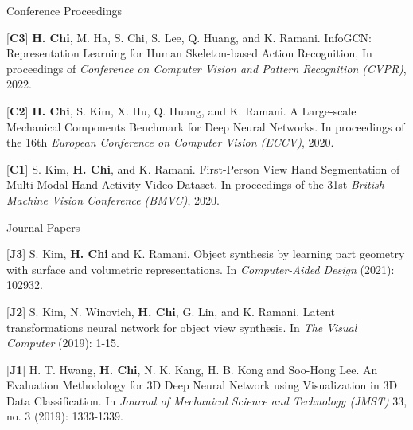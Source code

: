 


\begin{cventries}
\cvpub
{Conference Proceedings} %
{ %
\begin{cvitems}
\item {[\textbf{C3}] \textbf{H. Chi}, M. Ha, S. Chi, S. Lee, Q. Huang, and K. Ramani. InfoGCN: Representation Learning for Human Skeleton-based Action Recognition, In proceedings of \textit{Conference on Computer Vision and Pattern Recognition (CVPR)}, 2022.}
\item {[\textbf{C2}] \textbf{H. Chi}, S. Kim, X. Hu, Q. Huang, and K. Ramani. A Large-scale Mechanical Components Benchmark for Deep Neural Networks. In proceedings of the 16th \textit{European Conference on Computer Vision (ECCV)}, 2020.}
\item {[\textbf{C1}] S. Kim, \textbf{H. Chi}, and K. Ramani. First-Person View Hand Segmentation of Multi-Modal Hand Activity Video Dataset. In proceedings of the 31st \textit{British Machine Vision Conference (BMVC)}, 2020.}
\end{cvitems}
}


\cvpub
{Journal Papers} %
{ %
\begin{cvitems}
\item {[\textbf{J3}] S. Kim, \textbf{H. Chi} and K. Ramani. Object synthesis by learning part geometry with surface and volumetric representations. In \textit{Computer-Aided Design} (2021): 102932.}
\item {[\textbf{J2}] S. Kim, N. Winovich, \textbf{H. Chi}, G. Lin, and K. Ramani. Latent transformations neural network for object view synthesis. In \textit{The Visual Computer} (2019): 1-15.}
\item {[\textbf{J1}] H. T. Hwang, \textbf{H. Chi}, N. K. Kang, H. B. Kong and Soo-Hong Lee. An Evaluation Methodology for 3D Deep Neural Network using Visualization in 3D Data Classification. In \textit{Journal of Mechanical Science and Technology (JMST)} 33, no. 3 (2019): 1333-1339.}
\end{cvitems}
}


\end{cventries}
